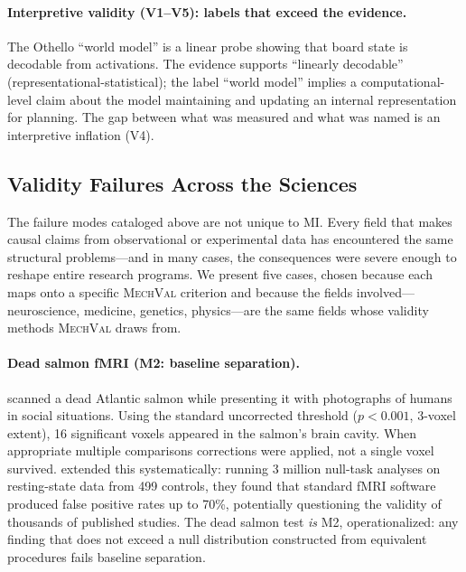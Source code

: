 \documentclass[10pt]{article}
\newcommand{\mechval}{\textsc{MechVal}}
\begin{document}
\paragraph{Interpretive validity (V1--V5): labels that exceed the evidence.}
The Othello ``world model'' \citep{li2023othello} is a linear probe showing that board state is decodable from activations. The evidence supports ``linearly decodable'' (representational-statistical); the label ``world model'' implies a computational-level claim about the model maintaining and updating an internal representation for planning. The gap between what was measured and what was named is an interpretive inflation (V4).

\subsection{Validity Failures Across the Sciences}

The failure modes cataloged above are not unique to MI. Every field that makes causal claims from observational or experimental data has encountered the same structural problems---and in many cases, the consequences were severe enough to reshape entire research programs. We present five cases, chosen because each maps onto a specific \mechval{} criterion and because the fields involved---neuroscience, medicine, genetics, physics---are the same fields whose validity methods \mechval{} draws from.

\paragraph{Dead salmon fMRI (M2: baseline separation).}
\citet{bennett2010neural} scanned a dead Atlantic salmon while presenting it with photographs of humans in social situations. Using the standard uncorrected threshold ($p < 0.001$, 3-voxel extent), 16 significant voxels appeared in the salmon's brain cavity. When appropriate multiple comparisons corrections were applied, not a single voxel survived. \citet{eklund2016cluster} extended this systematically: running 3 million null-task analyses on resting-state data from 499 controls, they found that standard fMRI software produced false positive rates up to 70\%, potentially questioning the validity of thousands of published studies. The dead salmon test \emph{is} M2, operationalized: any finding that does not exceed a null distribution constructed from equivalent procedures fails baseline separation.
\end{document}
